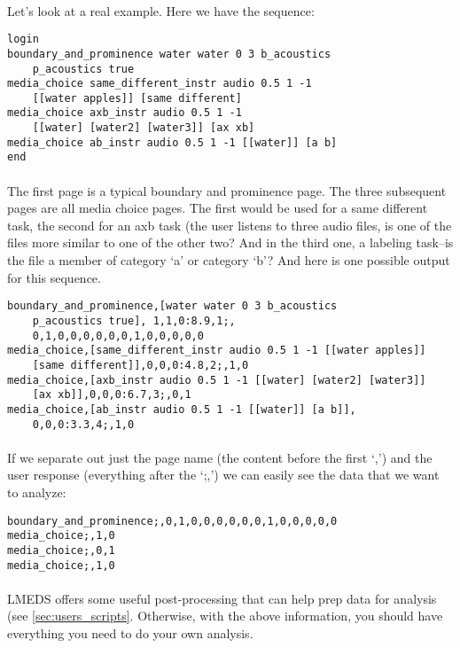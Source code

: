 \paragraph{}
Let's look at a real example.  Here we have the sequence:

\begin{lstlisting}
login
boundary_and_prominence water water 0 3 b_acoustics
	p_acoustics true
media_choice same_different_instr audio 0.5 1 -1 
	[[water apples]] [same different]
media_choice axb_instr audio 0.5 1 -1
	[[water] [water2] [water3]] [ax xb]
media_choice ab_instr audio 0.5 1 -1 [[water]] [a b]
end
\end{lstlisting}

\paragraph{}
The first page is a typical boundary and prominence page.  The three subsequent pages are all media choice pages.  The first would be used for a same different task, the second for an axb task (the user listens to three audio files, is one of the files more similar to one of the other two?  And in the third one, a labeling task--is the file a member of category `a' or category `b'?
And here is one possible output for this sequence.

\begin{lstlisting}
boundary_and_prominence,[water water 0 3 b_acoustics
	p_acoustics true], 1,1,0:8.9,1;,
	0,1,0,0,0,0,0,0,1,0,0,0,0,0
media_choice,[same_different_instr audio 0.5 1 -1 [[water apples]]
	[same different]],0,0,0:4.8,2;,1,0
media_choice,[axb_instr audio 0.5 1 -1 [[water] [water2] [water3]]
	[ax xb]],0,0,0:6.7,3;,0,1
media_choice,[ab_instr audio 0.5 1 -1 [[water]] [a b]],
	0,0,0:3.3,4;,1,0
\end{lstlisting}

\paragraph{}
If we separate out just the page name (the content before the first `,') and the user response (everything after the `;,') we can easily see the data that we want to analyze: 

\begin{lstlisting}
boundary_and_prominence;,0,1,0,0,0,0,0,0,1,0,0,0,0,0
media_choice;,1,0
media_choice;,0,1
media_choice;,1,0
\end{lstlisting}

\paragraph{}
LMEDS offers some useful post-processing that can help prep data for analysis (see \ref{sec:users_scripts}.  Otherwise, with the above information, you should have everything you need to do your own analysis.


